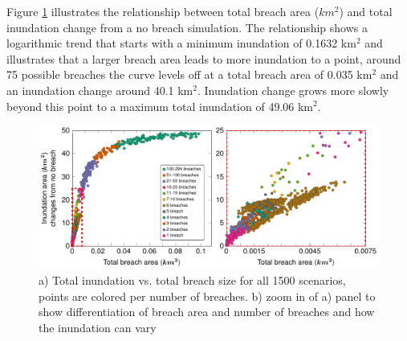 \documentclass{coastal_paper}
\begin{document}
Figure \ref{fig:5} illustrates the relationship between total breach area ($km^2$) and total inundation change from a no breach simulation. The relationship shows a logarithmic trend that starts with a minimum inundation of 0.1632 km$^2$ and illustrates that a larger breach area leads to more inundation to a point, around 75 possible breaches the curve levels off at a total breach area of 0.035 km$^2$ and an inundation change around 40.1 km$^2$. Inundation change grows more slowly beyond this point to a maximum total inundation of 49.06 km$^2$.

\begin{figure}[ht]
    \centering
    \includegraphics[width=\textwidth]{figures/fig5_v2.pdf}
    \caption{a) Total inundation vs. total breach size for all 1500 scenarios, points are colored per number of breaches. b) zoom in of a) panel to show differentiation of breach area and number of breaches and how the inundation can vary}
    \label{fig:5}
\end{figure}
\end{document}
